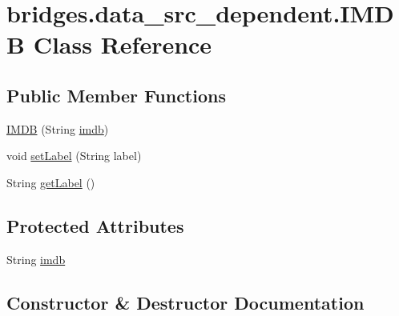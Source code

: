 \hypertarget{classbridges_1_1data__src__dependent_1_1_i_m_d_b}{}\section{bridges.\+data\+\_\+src\+\_\+dependent.\+I\+M\+DB Class Reference}
\label{classbridges_1_1data__src__dependent_1_1_i_m_d_b}
\subsection*{Public Member Functions}
\begin{DoxyCompactItemize}
\item 
\mbox{\hyperlink{classbridges_1_1data__src__dependent_1_1_i_m_d_b_aff9987e893b16275182bc81b7e64b048}{I\+M\+DB}} (String \mbox{\hyperlink{classbridges_1_1data__src__dependent_1_1_i_m_d_b_a2913407abe6019a396d4a2ac086283df}{imdb}})
\item 
void \mbox{\hyperlink{classbridges_1_1data__src__dependent_1_1_i_m_d_b_a9022297c43873b9df0ad6d3c91977bd8}{set\+Label}} (String label)
\item 
String \mbox{\hyperlink{classbridges_1_1data__src__dependent_1_1_i_m_d_b_ad2d0e1edabdb0596a3308c160f63cb2b}{get\+Label}} ()
\end{DoxyCompactItemize}
\subsection*{Protected Attributes}
\begin{DoxyCompactItemize}
\item 
String \mbox{\hyperlink{classbridges_1_1data__src__dependent_1_1_i_m_d_b_a2913407abe6019a396d4a2ac086283df}{imdb}}
\end{DoxyCompactItemize}


\subsection{Constructor \& Destructor Documentation}
\mbox{\label{classbridges_1_1data__src__dependent_1_1_i_m_d_b_aff9987e893b16275182bc81b7e64b048}} 
